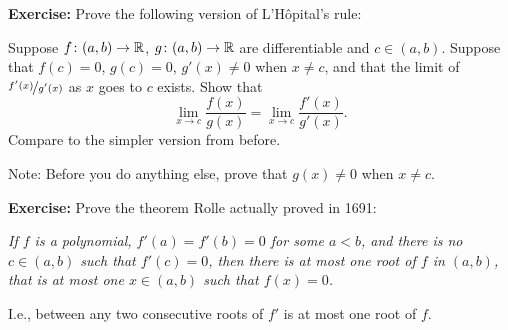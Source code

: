\documentclass[10pt,aspectratio=169]{beamer}
\begin{document}
\begin{frame}

\textbf{Exercise:}
Prove the following version of L'H\^opital's rule:

\pause
Suppose 
$f \colon (a,b) \to {\mathbb{R}}$, $g \colon (a,b) \to {\mathbb{R}}$ are differentiable
and $c \in (a,b)$.
\pause
Suppose that $f(c) = 0$, $g(c)=0$,
$g'(x) \not= 0$ when $x \not= c$, and
that the limit of $\nicefrac{f'(x)}{g'(x)}$ as $x$ goes to $c$ exists.
\pause
Show that
\begin{equation*}
\lim_{x \to c} \frac{f(x)}{g(x)} = 
\lim_{x \to c} \frac{f'(x)}{g'(x)} .
\end{equation*}
\pause
Compare to the simpler version from before.

\pause
Note: Before you do anything else, prove that $g(x) \not= 0$ when $x \not= c$.

\pause
\medskip

\textbf{Exercise:}
Prove the theorem Rolle actually proved in 1691:
\pause

\medskip

\emph{If $f$ is a polynomial,
$f'(a) = f'(b) = 0$ for some $a < b$,
and there is no $c \in (a,b)$ such that $f'(c) = 0$,
then there is at most one root of $f$ in $(a,b)$,
that is at most one $x \in (a,b)$ such that $f(x) = 0$.}
\pause

\medskip

I.e., between any two consecutive roots of $f'$ is at most one
root of $f$.

\end{frame}
\end{document}
